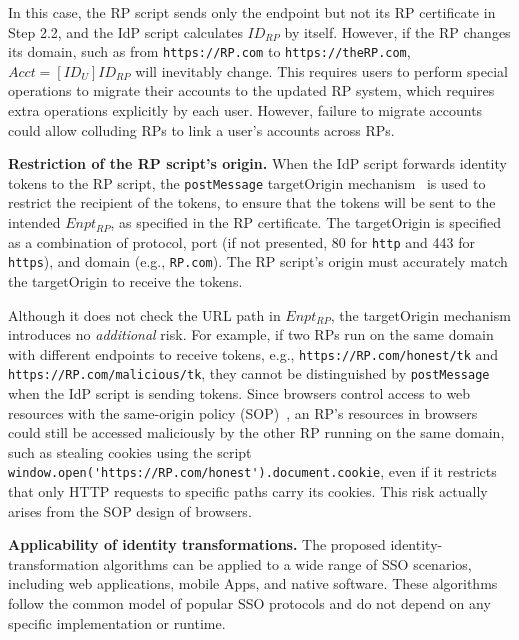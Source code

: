 In this case, the RP script sends only the endpoint but not its RP certificate in Step 2.2, and the IdP script calculates $ID_{RP}$ by itself. %
However, if the RP changes its domain, such as from \verb+https://RP.com+ to \verb+https://theRP.com+,
$Acct = [ID_U]ID_{RP}$ will inevitably change.
This requires users to perform special operations to migrate their accounts to the updated RP system,
 which requires extra operations explicitly by each user.
 \textcolor[rgb]{1.00,0.00,0.00}{However, failure to migrate accounts could allow colluding RPs to link a user's accounts across RPs.}

\noindent \textbf{Restriction of the RP script's origin.}
When the IdP script forwards identity tokens to the RP script,
 the \verb+postMessage+ targetOrigin mechanism~\cite{postm-targeto} is used to restrict the recipient of the tokens,
  to ensure that the tokens will be sent to the intended $Enpt_{RP}$, as specified in the RP certificate.
  The targetOrigin is specified as a combination of protocol, port (if not presented, 80 for \verb+http+ and 443 for \verb+https+), and domain (e.g., \verb+RP.com+).
The RP script's origin must accurately match the targetOrigin to receive the tokens.

Although it does not check the URL path in $Enpt_{RP}$,
the targetOrigin mechanism introduces no {\em additional} risk.
For example, if two RPs run on the same domain with different endpoints to receive tokens,
 e.g., \verb+https://RP.com/honest/tk+ and \verb+https://RP.com/malicious/tk+,
  they cannot be distinguished by \verb+postMessage+ when the IdP script is sending tokens.
Since browsers control access to web resources with the same-origin policy (SOP)~\cite{sop},
   an RP's resources in browsers could still be accessed maliciously by the other RP running on the same domain,
    such as stealing cookies using the script \verb+window.open('https://RP.com/honest').document.cookie+,
even if it restricts that only HTTP requests to specific paths carry its cookies.
 This risk actually arises from the SOP design of browsers. %



\noindent \textbf{Applicability of identity transformations.}
The proposed identity-transformation algorithms %
can be applied to a wide range of SSO scenarios, including web applications, mobile Apps, and native software.
These algorithms follow the common model of popular SSO protocols and do not depend on any specific implementation or runtime.%



